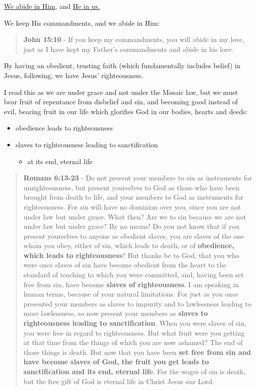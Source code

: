 \documentclass[11pt]{article}
\begin{document}
\uline{We abide in Him}, and \uline{He in us.}

We keep His commandments, and we abide in Him:

\begin{quote}
\textbf{John 15:10} - If you keep my commandments, you will abide in my love, just as I have kept my Father's commandments and abide in his love.
\end{quote}

By having an obedient, trusting faith (which fundamentally includes belief) in Jesus, following, we have Jesus' righteousness.

I read this as we are under grace and not
under the Mosaic law, but we must bear fruit
of repentance from disbelief and sin, and
becoming good instead of evil, bearing fruit
in our life which glorifies God in our bodies,
hearts and deeds:
\begin{itemize}
\item obedience leads to righteousness
\item slaves to righteousness leading to sanctification
\begin{itemize}
\item at its end, eternal life
\end{itemize}
\end{itemize}

\begin{quote}
\textbf{Romans 6:13-23} - Do not present your members to sin as instruments for unrighteousness, but present yourselves to God as those who have been brought from death to life, and your members to God as instruments for righteousness.  For sin will have no dominion over you, since you are not under law but under grace.  What then? Are we to sin because we are not under law but under grace? By no means!  Do you not know that if you present yourselves to anyone as obedient slaves, you are slaves of the one whom you obey, either of sin, which leads to death, or of \textbf{obedience, which leads to righteousness}?  But thanks be to God, that you who were once slaves of sin have become obedient from the heart to the standard of teaching to which you were committed, and, having been set free from sin, have become \textbf{slaves of righteousness}.  I am speaking in human terms, because of your natural limitations. For just as you once presented your members as slaves to impurity and to lawlessness leading to more lawlessness, so now present your members as \textbf{slaves to righteousness leading to sanctification}.  When you were slaves of sin, you were free in regard to righteousness.  But what fruit were you getting at that time from the things of which you are now ashamed? The end of those things is death.  But now that you have been \textbf{set free from sin and have become slaves of God, the fruit you get leads to sanctification and its end, eternal life}.  For the wages of sin is death, but the free gift of God is eternal life in Christ Jesus our Lord.
\end{quote}
\end{document}
